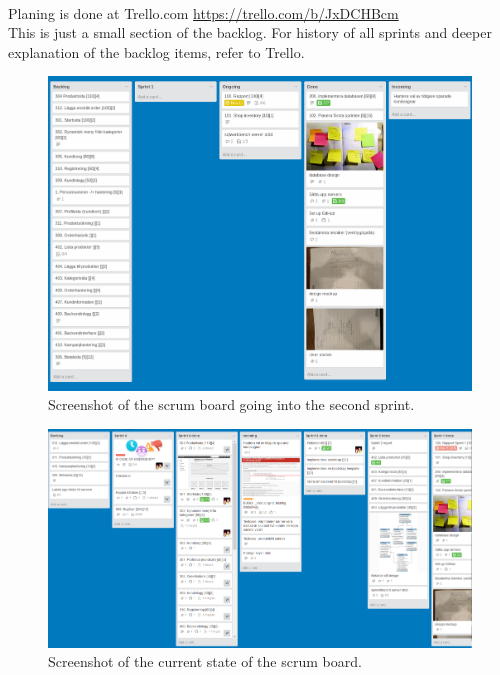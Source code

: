 \documentclass[paper=a4, fontsize=11pt]{report} %
\begin{document}
\begin{itemize}
	 \\

	Planing is done at Trello.com
	\url{https://trello.com/b/JxDCHBcm} \\
	This is just a small section of the backlog. For history of all sprints and deeper
	explanation of the backlog items, refer to Trello.


	\begin{figure}[h]
		\includegraphics[width=\textwidth]{artifacts/trello_sprint1.png}
		\caption{Screenshot of the scrum board going into the second sprint.}
		\label{fig:trello_sprint1}
	\end{figure}

	\begin{figure}[h]
		\includegraphics[width=\textwidth]{artifacts/trello_final.png}
		\caption{Screenshot of the current state of the scrum board.}
		\label{fig:trello_final}
	\end{figure}


\end{itemize}
\end{document}
